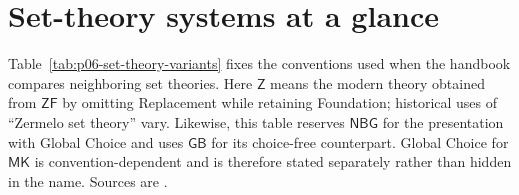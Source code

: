 \section{Set-theory systems at a glance}

Table~\ref{tab:p06-set-theory-variants} fixes the conventions used when the
handbook compares neighboring set theories.  Here \(\mathsf Z\) means the
modern theory obtained from \(\mathsf{ZF}\) by omitting Replacement while
retaining Foundation; historical uses of ``Zermelo set theory'' vary.
Likewise, this table reserves \(\mathsf{NBG}\) for the presentation with
Global Choice and uses \(\mathsf{GB}\) for its choice-free counterpart.
Global Choice for \(\mathsf{MK}\) is convention-dependent and is therefore
stated separately rather than hidden in the name.  Sources are
\cite{Jech2003,Barwise1975,Mendelson1997,Kelley1975,Quine1937,Specker1953,
Wilshaw2025ConNF}.

